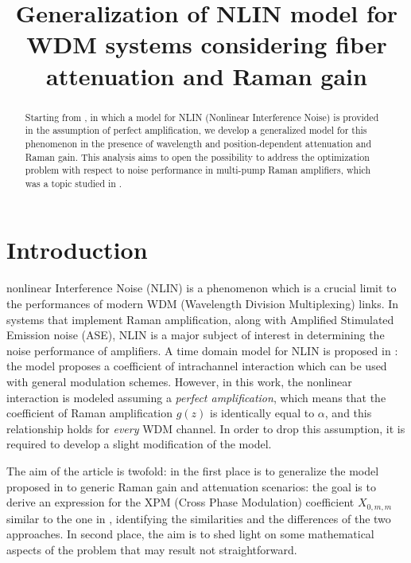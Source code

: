 \documentclass[10pt, lettersize, journal, onecolumn]{IEEEtran}
\title{Generalization of NLIN model for WDM systems considering fiber attenuation and Raman gain}
\begin{document}
\maketitle


\begin{abstract}
Starting from \cite{Dar_2013}, in which a model for NLIN (Nonlinear Interference Noise) is provided in the assumption of perfect amplification, we develop a generalized model for this phenomenon in the presence of wavelength and position-dependent attenuation and Raman gain. This analysis aims to open the possibility to address the optimization problem with respect to noise performance in multi-pump Raman amplifiers, which was a topic studied in \cite{Marcon_2021}.
\end{abstract}
\section{Introduction}
nonlinear Interference Noise (NLIN) is a phenomenon which is a crucial limit to the performances of modern WDM (Wavelength Division Multiplexing) links. In systems that implement Raman amplification, along with Amplified Stimulated Emission noise (ASE), NLIN is a major subject of interest in determining the noise performance of amplifiers. A time domain model for NLIN is proposed in \cite{Dar_2013}: the model proposes a coefficient of intrachannel interaction which can be used with general modulation schemes. However, in this work, the nonlinear interaction is modeled assuming a \textit{perfect amplification}, which means that the coefficient of Raman amplification $g(z)$ is identically equal to $\alpha$, and this relationship holds for \textit{every} WDM channel.
In order to drop this assumption, it is required to develop a slight modification of the model.

The aim of the article is twofold: in the first place is to generalize the model proposed in \cite{Dar_2013} to generic Raman gain and attenuation scenarios: the goal is to derive an expression for the XPM (Cross Phase Modulation) coefficient $X_{0, m, m}$ similar to the one in \cite{Dar_2013}, identifying the similarities and the differences of the two approaches.
In second place, the aim is to shed light on some mathematical aspects of the problem that may result not straightforward.
\end{document}
